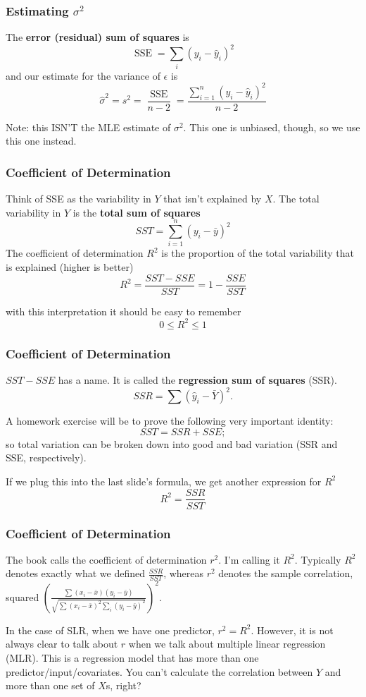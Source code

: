 \documentclass{beamer}
\begin{document}
\begin{frame}
\frametitle{Estimating $\sigma^2$}

The \textbf{error (residual) sum of squares} is
\[
\operatorname{SSE} = \sum_i (y_i - \hat{y}_i)^2
\]
and our estimate for the variance of $\epsilon$ is
\[
\hat{\sigma}^2 = s^2 = \frac{\operatorname{SSE}}{n-2} = \frac{\sum_{i=1}^n(y_i - \hat{y}_i)^2}{n-2}
\]

Note: this ISN'T the MLE estimate of $\sigma^2$. This one is unbiased, though, so we use this one instead. 
\end{frame}
\begin{frame}
\frametitle{Coefficient of Determination}

Think of SSE as the variability in $Y$ that isn't explained by $X$. The total variability in $Y$ is the \textbf{total sum of squares}
\[
SST = \sum_{i=1}^n(y_i - \bar{y})^2
\]
The coefficient of determination $R^2$ is the proportion of the total variability that is explained (higher is better)
\[
R^2 = \frac{SST - SSE}{SST} = 1 - \frac{SSE}{SST}
\]

with this interpretation it should be easy to remember
\[
0 \le R^2 \le 1
\]
\end{frame}
\begin{frame}
\frametitle{Coefficient of Determination}

$SST - SSE$ has a name. It is called the \textbf{regression sum of squares} (SSR).
\[
SSR = \sum(\hat{y}_i - \bar{Y})^2.
\]

A homework exercise will be to prove the following very important identity:
\[
SST = SSR + SSE;
\]
so total variation can be broken down into good and bad variation (SSR and SSE, respectively).
\newline

If we plug this into the last slide's formula, we get another expression for $R^2$
\[
R^2 = \frac{SSR}{SST}
\]
\end{frame}
\begin{frame}
\frametitle{Coefficient of Determination}

The book calls the coefficient of determination $r^2$. I'm calling it $R^2$. Typically $R^2$ denotes exactly what we defined $\frac{SSR}{SST}$, whereas $r^2$ denotes the sample correlation, squared $ \left( \frac{\sum(x_i - \bar{x})(y_i - \bar{y})}{\sqrt{ \sum(x_i-\bar{x})^2 \sum_i(y_i - \bar{y})^2 }} \right)^2$.
\newline

In the case of SLR, when we have one predictor, $r^2 = R^2$. However, it is not always clear to talk about $r$ when we talk about multiple linear regression (MLR). This is a regression model that has more than one predictor/input/covariates. You can't calculate the correlation between $Y$ and more than one set of $X$s, right? 

\end{frame}
\end{document}
